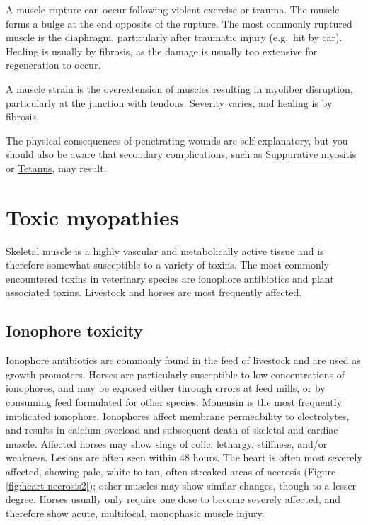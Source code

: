\documentclass[openany]{book}
\begin{document}
A muscle rupture can occur following violent exercise or trauma. The
muscle forms a bulge at the end opposite of the rupture. The most
commonly ruptured muscle is the diaphragm, particularly after traumatic
injury (e.g.~hit by car). Healing is usually by fibrosis, as the damage
is usually too extensive for regeneration to occur.

A muscle strain is the overextension of muscles resulting in myofiber
disruption, particularly at the junction with tendons. Severity varies,
and healing is by fibrosis.

The physical consequences of penetrating wounds are self-explanatory,
but you should also be aware that secondary complications, such as
\protect\hyperlink{suppurative-myositis}{Suppurative myositis} or
\protect\hyperlink{tetanus}{Tetanus}, may result.

\chapter{Toxic myopathies}\label{toxic-myopathies}

Skeletal muscle is a highly vascular and metabolically active tissue and
is therefore somewhat susceptible to a variety of toxins. The most
commonly encountered toxins in veterinary species are ionophore
antibiotics and plant associated toxins. Livestock and horses are most
frequently affected.

\hypertarget{ionophore-toxicity}{\section{Ionophore
toxicity}\label{ionophore-toxicity}}

Ionophore antibiotics are commonly found in the feed of livestock and
are used as growth promoters. Horses are particularly susceptible to low
concentrations of ionophores, and may be exposed either through errors
at feed mills, or by consuming feed formulated for other species.
Monensin is the most frequently implicated ionophore. Ionophores affect
membrane permeability to electrolytes, and results in calcium overload
and subsequent death of skeletal and cardiac muscle. Affected horses may
show sings of colic, lethargy, stiffness, and/or weakness. Lesions are
often seen within 48 hours. The heart is often most severely affected,
showing pale, white to tan, often streaked areas of necrosis (Figure
\ref{fig:heart-necrosis2}); other muscles may show similar changes,
though to a lesser degree. Horses usually only require one dose to
become severely affected, and therefore show acute, multifocal,
monophasic muscle injury.
\end{document}
